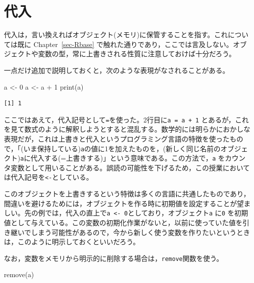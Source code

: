 \documentclass[
  a4paper,
]{ltjsbook}
\newenvironment{Shaded}{\begin{snugshade}}{\end{snugshade}}
\newcommand{\DecValTok}[1]{\textcolor[rgb]{0.68,0.00,0.00}{#1}}
\newcommand{\FunctionTok}[1]{\textcolor[rgb]{0.28,0.35,0.67}{#1}}
\newcommand{\NormalTok}[1]{\textcolor[rgb]{0.00,0.23,0.31}{#1}}
\newcommand{\OtherTok}[1]{\textcolor[rgb]{0.00,0.23,0.31}{#1}}
\newcommand{\SpecialCharTok}[1]{\textcolor[rgb]{0.37,0.37,0.37}{#1}}
\begin{document}
\section{代入}\label{ux4ee3ux5165}

代入は，言い換えればオブジェクト(メモリ)に保管することを指す。これについては既に
Chapter~\ref{sec-Rbase}
で触れた通りであり，ここでは言及しない。オブジェクトや変数の型，常に上書きされる性質に注意しておけば十分だろう。

一点だけ追加で説明しておくと，次のような表現がなされることがある。

\begin{Shaded}
\begin{Highlighting}[]
\NormalTok{a }\OtherTok{\textless{}{-}} \DecValTok{0}
\NormalTok{a }\OtherTok{\textless{}{-}}\NormalTok{ a }\SpecialCharTok{+} \DecValTok{1}
\FunctionTok{print}\NormalTok{(a)}
\end{Highlighting}
\end{Shaded}

\begin{verbatim}
[1] 1
\end{verbatim}

ここではあえて，代入記号として\texttt{=}を使った。2行目に\texttt{a\ =\ a\ +\ 1}
とあるが，これを見て数式のように解釈しようとすると混乱する。数学的には明らかにおかしな表現だが，これは上書きと代入というプログラミング言語の特徴を使ったもので，「(いま保持している)\texttt{a}の値に1を加えたものを，(新しく同じ名前のオブジェクト)\texttt{a}に代入する(=上書きする)」という意味である。この方法で，\texttt{a}
をカウンタ変数として用いることがある。誤読の可能性を下げるため，この授業においては代入記号を\texttt{\textless{}-}としている。

このオブジェクトを上書きするという特徴は多くの言語に共通したものであり，間違いを避けるためには，オブジェクトを作る時に初期値を設定することが望ましい。先の例では，代入の直上で\texttt{a\ \textless{}-\ 0}としており，オブジェクト\texttt{a}
に\texttt{0}
を初期値として与えている。この変数の初期化作業がないと，以前に使っていた値を引き継いでしまう可能性があるので，今から新しく使う変数を作りたいというときは，このように明示しておくといいだろう。

なお，変数をメモリから明示的に削除する場合は，\texttt{remove}関数を使う。

\begin{Shaded}
\begin{Highlighting}[]
\FunctionTok{remove}\NormalTok{(a)}
\end{Highlighting}
\end{Shaded}
\end{document}

